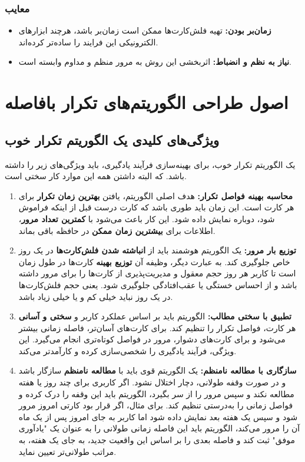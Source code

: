 \documentclass[12pt]{report}
\begin{document}
\subsection{معایب}
\begin{itemize}
    \item \textbf{زمان‌بر بودن:} تهیه فلش‌کارت‌ها ممکن است زمان‌بر باشد، هرچند ابزارهای الکترونیکی این فرایند را ساده‌تر کرده‌اند.
    \item \textbf{نیاز به نظم و انضباط:} اثربخشی این روش به مرور منظم و مداوم وابسته است.
\end{itemize}

\chapter{اصول طراحی الگوریتم‌های تکرار بافاصله}

\section{ویژگی‌های کلیدی یک الگوریتم تکرار خوب}
یک الگوریتم تکرار خوب، برای بهینه‌سازی فرآیند یادگیری، باید ویژگی‌های زیر را داشته باشد. که البته داشتن همه این موارد کار سختی است.

\begin{enumerate}
    \item \textbf{محاسبه بهینه فواصل تکرار:} هدف اصلی الگوریتم، یافتن \textbf{بهترین زمان تکرار} برای هر کارت است. این زمان باید طوری باشد که کارت درست قبل از اینکه فراموش شود، دوباره نمایش داده شود. این کار باعث می‌شود با \textbf{کمترین تعداد مرور}، اطلاعات برای \textbf{بیشترین زمان ممکن} در حافظه باقی بماند.

    \item \textbf{توزیع بار مرور:} یک الگوریتم هوشمند باید از \textbf{انباشته شدن فلش‌کارت‌ها} در یک روز خاص جلوگیری کند. به عبارت دیگر، وظیفه آن \textbf{توزیع بهینه} کارت‌ها در طول زمان است تا کاربر هر روز حجم معقول و مدیریت‌پذیری از کارت‌ها را برای مرور داشته باشد و از احساس خستگی یا عقب‌افتادگی جلوگیری شود. یعنی حجم فلش‌کارت‌ها در یک روز نباید خیلی کم و یا خیلی زیاد باشد.

    \item \textbf{تطبیق با سختی مطالب:} الگوریتم باید بر اساس عملکرد کاربر و \textbf{سختی و آسانی} هر کارت، فواصل تکرار را تنظیم کند. برای کارت‌های آسان‌تر، فاصله زمانی بیشتر می‌شود و برای کارت‌های دشوار، مرور در فواصل کوتاه‌تری انجام می‌گیرد. این ویژگی، فرآیند یادگیری را شخصی‌سازی کرده و کارآمدتر می‌کند.

    \item \textbf{سازگاری با مطالعه نامنظم:} یک الگوریتم قوی باید با \textbf{مطالعه نامنظم} سازگار باشد و در صورت وقفه طولانی، دچار اختلال نشود. اگر کاربری برای چند روز یا هفته مطالعه نکند و سپس مرور را از سر بگیرد، الگوریتم باید این وقفه را درک کرده و فواصل زمانی را به‌درستی تنظیم کند. برای مثال، اگر قرار بود کارتی امروز مرور شود و سپس یک هفته بعد نمایش داده شود اما کاربر به جای امروز پس از یک ماه آن را مرور می‌کند، الگوریتم باید این فاصله زمانی طولانی را به عنوان یک "یادآوری موفق" ثبت کند و فاصله بعدی را بر اساس این واقعیت جدید، به جای یک هفته، به مراتب طولانی‌تر تعیین نماید.
\end{enumerate}
\end{document}
